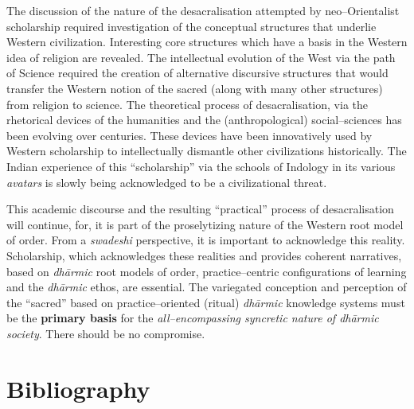 The discussion of the nature of the desacralisation attempted by neo–Orientalist scholarship required investigation of the conceptual structures that underlie Western civilization. Interesting core structures which have a basis in the Western idea of religion are revealed. The intellectual evolution of the West via the path of Science required the creation of alternative discursive structures that would transfer the Western notion of the sacred (along with many other structures) from religion to science. The theoretical process of desacralisation, via the rhetorical devices of the humanities and the (anthropological) social–sciences has been evolving over centuries. These devices have been innovatively used by Western scholarship to intellectually dismantle other civilizations historically. The Indian experience of this “scholarship” via the schools of Indology in its various \textit{avatars} is slowly being acknowledged to be a civilizational threat.

This academic discourse and the resulting “practical” process of desacralisation will continue, for, it is part of the proselytizing nature of the Western root model of order. From a \textit{swadeshi} perspective, it is important to acknowledge this reality. Scholarship, which acknowledges these realities and provides coherent narratives, based on \textit{dhārmic} root models of order, practice–centric configurations of learning and the \textit{dhārmic} ethos, are essential. The variegated conception and perception of the “sacred” based on practice–oriented (ritual) \textit{dhārmic} knowledge systems must be the \textbf{primary basis} for the\textit{ all–encompassing syncretic nature of dhārmic society}. There should be no compromise.


\section*{Bibliography}

